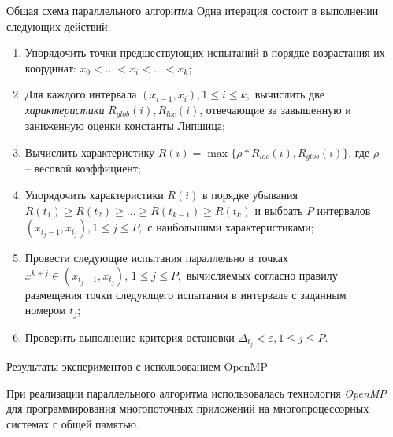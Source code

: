 \documentclass{beamer}
\begin{document}
\begin{frame}[t]
\begin{columns}[t]
\begin{column}[t]{0.465\paperwidth}
        \end{column}
        \begin{column}[t]{0.47\paperwidth}
          \begin{block}{Общая схема параллельного алгоритма}
\leftskip=0.5cm \rightskip=0.5cm 
\setlength{\parindent}{1.25cm} %
Одна итерация состоит в выполнении следующих действий:
              \begin{enumerate}
              \leftskip=0.5cm \rightskip=0.5cm 
\setlength{\parindent}{1.25cm} %
                \justifying
                \item Упорядочить точки предшествующих испытаний в порядке возрастания их координат: \(x_{0}<...<x_{i}<...<x_{k}\);
                \item Для каждого интервала \((x_{i-1}, x_{i}),1\leqslant i\leqslant k,\) вычислить две \textit{характеристики} \(R_{glob}(i), R_{loc}(i)\), отвечающие за завышенную и заниженную оценки константы Липшица;
                \item Вычислить характеристику \(R(i) = \max⁡\{\rho*R_{loc}(i),R_{glob}(i)\}\), где \(\rho\) -- весовой коэффициент; 
                \item Упорядочить характеристики \(R(i)\) в порядке убывания \(R(t_{1})\geqslant R(t_{2})\geqslant ... \geqslant  R(t_{k-1})\geqslant R(t_{k})\) и выбрать \(P\) интервалов \((x_{t_j-1}, x_{t_j}), 1\leqslant j \leqslant P,\) с наибольшими характеристиками;
                \item Провести следующие испытания параллельно в точках  \(x^{k+j} \in (x_{t_j-1}, x_{t_j})\), \(1\leqslant j \leqslant P,\) вычисляемых согласно правилу размещения точки следующего испытания в интервале с заданным номером \(t_j\);
                \item Проверить выполнение критерия остановки \(\Delta_{t_j}<\varepsilon, 1\leqslant j \leqslant P\).
              \end{enumerate}

\end{block}


\begin{block}{Результаты экспериментов с использованием OpenMP}

\leftskip=0.5cm \rightskip=0.5cm 
\setlength{\parindent}{1.25cm} %
При реализации параллельного алгоритма использовалась технология \textit{OpenMP} для программирования многопоточных приложений на многопроцессорных системах с общей памятью.


\end{block}
\end{column}
\end{columns}
\end{frame}
\end{document}
